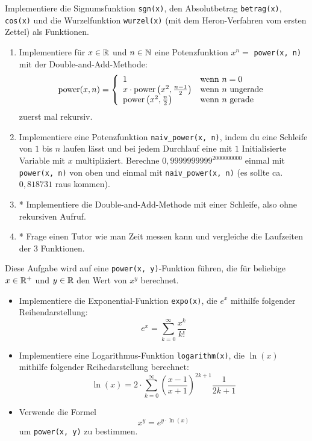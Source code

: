 \documentclass{uebungszettel}
\begin{document}
\begin{aufg}
Implementiere die Signumsfunktion \verb|sgn(x)|, den Absolutbetrag \verb|betrag(x)|, \verb|cos(x)| und die Wurzelfunktion \verb|wurzel(x)| (mit dem Heron-Verfahren vom ersten Zettel) als Funktionen.
\end{aufg}


\begin{aufg}
\begin{enumerate}[leftmargin=*]
\item Implementiere für $x \in \mathbb{R}$ und $n \in \mathbb{N}$ eine Potenzfunktion $x^n=$ \verb|power(x, n)| mit der Double-and-Add-Methode: \[
	\mathrm{power}(x, n) = \left\{ \begin{array}{ll}
	1 & \text{wenn } n = 0 \\
	x \cdot \mathrm{power}\left(x^2, \frac{n-1}{2}\right) & \text{wenn } n \text{ ungerade} \\
	\mathrm{power}\left(x^2, \frac{n}{2}\right) & \text{wenn } n \text{ gerade} \\
	\end{array}
	\right.
\]
zuerst mal rekursiv. 
\item Implementiere eine Potenzfunktion \verb|naiv_power(x, n)|, indem du eine Schleife von $1$ bis $n$ laufen lässt und bei jedem Durchlauf eine mit $1$ Initialisierte Variable mit $x$ multipliziert. Berechne $0,9999999999^{2000000000}$ einmal mit \verb|power(x, n)| von oben und einmal mit \verb|naiv_power(x, n)| (es sollte ca. $0,818731$ raus kommen). 
\item* Implementiere die Double-and-Add-Methode mit einer Schleife, also ohne rekursiven Aufruf.
\item* Frage einen Tutor wie man Zeit messen kann und vergleiche die Laufzeiten der 3 Funktionen.
\end{enumerate}
\end{aufg}

\begin{aufg}
Diese Aufgabe wird auf eine \verb|power(x, y)|-Funktion führen, die für beliebige $x \in \mathbb{R}^+$ und $y \in \mathbb{R}$ den Wert von $x^y$ berechnet.
\begin{itemize}
\item Implementiere die Exponential-Funktion \verb|expo(x)|, die $e^x$ mithilfe folgender Reihendarstellung: \[
e^x = \sum_{k=0}^\infty \frac{x^k}{k!} \]
\item Implementiere eine Logarithmus-Funktion \verb|logarithm(x)|, die $\ln(x)$ mithilfe folgender Reihedarstellung berechnet: \[
\ln(x) = 2\cdot \sum_{k = 0}^\infty \left(\frac{x-1}{x+1}\right)^{2k + 1} \frac{1}{2k + 1} \]
\item Verwende die Formel \[
x^y = e^{y \cdot \ln(x)} \] um \verb|power(x, y)| zu bestimmen.
\end{itemize}
\end{aufg}
\end{document}
